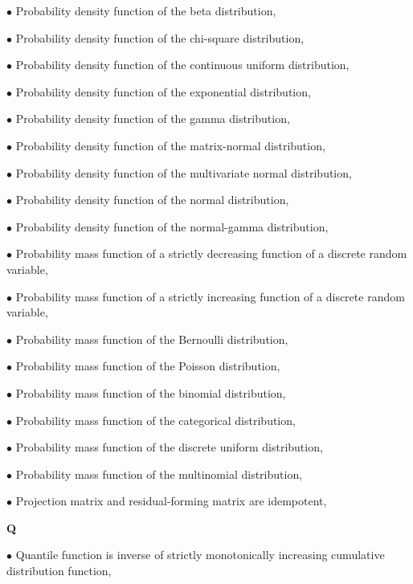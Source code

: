 \documentclass[a4paper,12pt,twoside]{book}
\begin{document}
$\bullet$ Probability density function of the beta distribution, \pageref{sec:beta-pdf}

$\bullet$ Probability density function of the chi-square distribution, \pageref{sec:chi2-pdf}

$\bullet$ Probability density function of the continuous uniform distribution, \pageref{sec:cuni-pdf}

$\bullet$ Probability density function of the exponential distribution, \pageref{sec:exp-pdf}

$\bullet$ Probability density function of the gamma distribution, \pageref{sec:gam-pdf}

$\bullet$ Probability density function of the matrix-normal distribution, \pageref{sec:matn-pdf}

$\bullet$ Probability density function of the multivariate normal distribution, \pageref{sec:mvn-pdf}

$\bullet$ Probability density function of the normal distribution, \pageref{sec:norm-pdf}

$\bullet$ Probability density function of the normal-gamma distribution, \pageref{sec:ng-pdf}

$\bullet$ Probability mass function of a strictly decreasing function of a discrete random variable, \pageref{sec:pmf-sdfct}

$\bullet$ Probability mass function of a strictly increasing function of a discrete random variable, \pageref{sec:pmf-sifct}

$\bullet$ Probability mass function of the Bernoulli distribution, \pageref{sec:bern-pmf}

$\bullet$ Probability mass function of the Poisson distribution, \pageref{sec:poiss-pmf}

$\bullet$ Probability mass function of the binomial distribution, \pageref{sec:bin-pmf}

$\bullet$ Probability mass function of the categorical distribution, \pageref{sec:cat-pmf}

$\bullet$ Probability mass function of the discrete uniform distribution, \pageref{sec:duni-pmf}

$\bullet$ Probability mass function of the multinomial distribution, \pageref{sec:mult-pmf}

$\bullet$ Projection matrix and residual-forming matrix are idempotent, \pageref{sec:mlr-idem}


\vspace{1em}
\textbf{Q}

$\bullet$ Quantile function is inverse of strictly monotonically increasing cumulative distribution function, \pageref{sec:qf-cdf}
\end{document}
